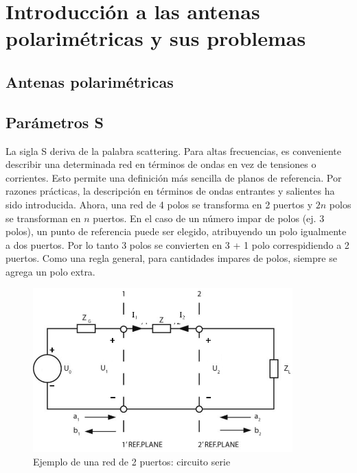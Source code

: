 
\chapter{Introducción a las antenas polarimétricas y sus problemas} %
\label{ch:motivacion}

\section{Antenas polarimétricas}


\section{Parámetros S}

La sigla S deriva de la palabra scattering. Para altas frecuencias, es conveniente describir una
determinada red en términos de ondas en vez de tensiones o corrientes. Esto permite una definición más 
sencilla de planos de referencia. Por razones prácticas, la descripción en términos de ondas entrantes
y salientes ha sido introducida. Ahora, una red de 4 polos se transforma en 2 puertos y $2n$ polos se 
transforman en $n$ puertos. En el caso de un número impar de polos (ej. 3 polos), un punto de referencia
puede ser elegido, atribuyendo un polo igualmente a dos puertos. Por lo tanto 3 polos se convierten en 
3 + 1 polo correspidiendo a 2 puertos. Como una regla general, para cantidades impares de polos, siempre
se agrega un polo extra.

\begin{figure}[H]
 \centering
 \includegraphics[width=10cm]{gfx/sParameters1.png}
 \caption{Ejemplo de una red de 2 puertos: circuito serie}
 \label{fig:esquema_serie}
\end{figure}

